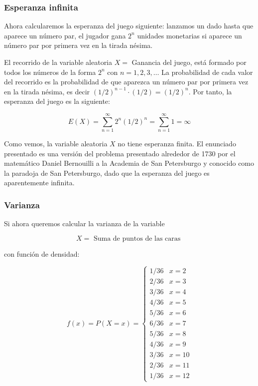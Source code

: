 \documentclass[
]{article}
\begin{document}
\subsubsection{Esperanza infinita}\label{esperanza-infinita}

Ahora calcularemos la esperanza del juego siguiente: lanzamos un dado
hasta que aparece un número par, el jugador gana \(2^{n}\) unidades
monetarias si aparece un número par por primera vez en la tirada nésima.

El recorrido de la variable aleatoria \(X=\) Ganancia del juego, está
formado por todos los números de la forma \(2^{n}\) con \(n=1,2,3, \ldots\)
La probabilidad de cada valor del recorrido es la probabilidad de que
aparezca un número par por primera vez en la tirada nésima, es decir
\((1 / 2)^{n-1} \cdot(1 / 2)=(1 / 2)^{n}\). Por tanto, la esperanza del
juego es la siguiente:

\[
E(X)=\sum_{n=1}^{\infty} 2^{n}(1 / 2)^{n}=\sum_{n=1}^{\infty} 1=\infty
\]

Como vemos, la variable aleatoria \(X\) no tiene esperanza finita. El
enunciado presentado es una versión del problema presentado alrededor de
1730 por el matemático Daniel Bernouilli a la Academia de San
Petersburgo y conocido como la paradoja de San Petersburgo, dado que la
esperanza del juego es aparentemente infinita.

\subsubsection{Varianza}\label{varianza}

Si ahora queremos calcular la varianza de la variable

\[
X=\text { Suma de puntos de las caras }
\]

con función de densidad:

\[
f(x)=P(X=x)= \begin{cases}1 / 36 & x=2 \\ 2 / 36 & x=3 \\ 3 / 36 & x=4 \\ 4 / 36 & x=5 \\ 5 / 36 & x=6 \\ 6 / 36 & x=7 \\ 5 / 36 & x=8 \\ 4 / 36 & x=9 \\ 3 / 36 & x=10 \\ 2 / 36 & x=11 \\ 1 / 36 & x=12\end{cases}
\]
\end{document}
